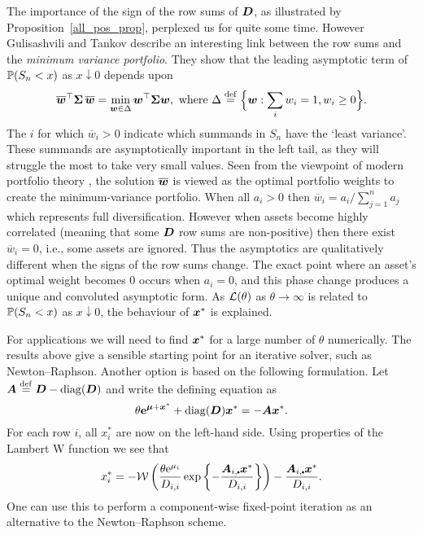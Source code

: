 \begin{remark}\label{Rem:25.8b} \rm The importance of the sign of the row sums of
  $\bm{D}$, as illustrated by Proposition~\ref{all_pos_prop}, perplexed us for
  quite some time. However Gulisashvili and Tankov \cite{tankov2015tail}
  describe an interesting link between the row sums and the \emph{minimum
    variance portfolio}. They show that the leading asymptotic term of
  $\mathbb{P}(S_n < x)$ as $x \downarrow 0$ depends upon
%
\[ \overline{\bm{w}}^\top \bm{\Sigma} \, \overline{\bm{w}}
 = \min_{\bm{w} \in \Delta} \bm{w}^\top \bm{\Sigma}  \bm{w} , \text{ where }
\Delta \overset{\mathrm{def}}{=} \Bigl\{ \bm{w} : \sum_i w_i = 1, w_i \geq 0 \Bigr\} . \]
%
The $i$ for which $\overline{w}_i > 0$ indicate which summands in $S_n$ have
the `least variance'. These summands are asymptotically important in the left
tail, as they will struggle the most to take very small values. Seen from the
viewpoint of modern portfolio theory \cite{markowitz1952portfolio}, the
solution $\overline{\bm{w}}$ is viewed as the optimal portfolio weights to
create the minimum-variance portfolio. When all $a_i > 0$ then $\overline{w}_i
= a_i / \sum_{j=1}^n a_j$ which represents full diversification. However when
assets become highly correlated (meaning that some $\bm{D}$ row sums are
non-positive) then there exist $\overline{w}_i = 0$, i.e., some assets are
ignored. Thus the asymptotics are qualitatively different when the signs of
the row sums change. The exact point where an asset's optimal weight becomes 0
occurs when $a_i = 0$, and this phase change produces a unique and convoluted
asymptotic form. As $\mathcal{L}(\theta)$ as $\theta \to \infty$ is related to
$\mathbb{P}(S_n < x)$ as $x \downarrow 0$, the behaviour of $\bm{x}^*$ is
explained.
\end{remark}

For applications we will need to find $\bm{x}^*$ for a large number of $\theta$
numerically. The results above give a sensible starting point for an iterative
solver, such as Newton--Raphson. Another option is based on the following
formulation. Let $\bm{A} \overset{\mathrm{def}}{=} \bm{D} - \mathrm{diag}(\bm{D})$ and write the defining
equation as
%
\[ \theta \bm{\mathrm{e}}^{\bm{\mu} + \bm{x}^*} + \mathrm{diag}(\bm{D})  \bm{x}^* = - \bm{A} \bm{x}^* . \]
%
For each row $i$, all $x_i^*$ are now on the left-hand side. Using properties
of the Lambert W function we see that
%
\[ x_i^* = -\LambertW\left( \frac{\theta \e^{\mu_i}}{D_{i,i}}
 \exp\left\{ - \frac{\bfA_{i,\sbullet} \bfx^*}{D_{i,i}} \right\} \right) -
 \frac{\bfA_{i,\sbullet} \bfx^*}{D_{i,i}} . \] One can use this to perform a
 component-wise fixed-point iteration as an alternative to the Newton--Raphson
 scheme.

